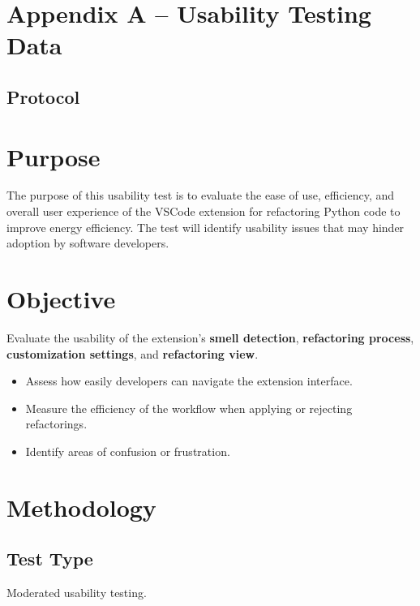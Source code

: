 \documentclass[12pt, titlepage]{article}
\begin{document}



\newpage
\section*{Appendix A -- Usability Testing Data} \label{appendix:usability}

\subsection*{Protocol}

\section*{Purpose}
The purpose of this usability test is to evaluate the ease of use, efficiency, and overall user experience of the VSCode extension for refactoring Python code to improve energy efficiency. The test will identify usability issues that may hinder adoption by software developers.

\section*{Objective}
Evaluate the usability of the extension’s \textbf{smell detection}, \textbf{refactoring process}, \textbf{customization settings}, and \textbf{refactoring view}.

\begin{itemize}
    \item Assess how easily developers can navigate the extension interface.
    \item Measure the efficiency of the workflow when applying or rejecting refactorings.
    \item Identify areas of confusion or frustration.
\end{itemize}

\section*{Methodology}
\subsection*{Test Type}
Moderated usability testing.
\end{document}

